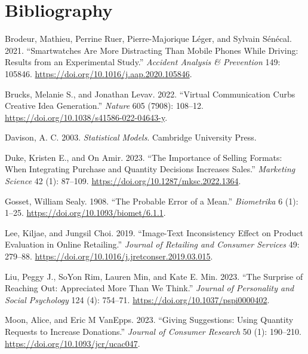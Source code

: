 \documentclass[
  11pt,
  letterpaper,
]{scrbook}
\newlength{\cslhangindent}
\newenvironment{CSLReferences}[2] %
 {\begin{list}{}{%
  \setlength{\itemindent}{0pt}
  \setlength{\leftmargin}{0pt}
  \setlength{\parsep}{0pt}
  \ifodd #1
   \setlength{\leftmargin}{\cslhangindent}
   \setlength{\itemindent}{-1\cslhangindent}
  \fi
  \setlength{\itemsep}{#2\baselineskip}}}
 {\end{list}}
\theoremstyle{plain}
\theoremstyle{definition}
\theoremstyle{definition}
\theoremstyle{remark}
\begin{document}

\chapter*{Bibliography}\label{bibliography}


\label{refs}
\begin{CSLReferences}{1}{0}
Brodeur, Mathieu, Perrine Ruer, Pierre-Majorique Léger, and Sylvain
Sénécal. 2021. {``Smartwatches Are More Distracting Than Mobile Phones
While Driving: Results from an Experimental Study.''} \emph{Accident
Analysis \& Prevention} 149: 105846.
\url{https://doi.org/10.1016/j.aap.2020.105846}.

Brucks, Melanie S., and Jonathan Levav. 2022. {``Virtual Communication
Curbs Creative Idea Generation.''} \emph{Nature} 605 (7908): 108--12.
\url{https://doi.org/10.1038/s41586-022-04643-y}.

Davison, A. C. 2003. \emph{Statistical Models}. Cambridge University
Press.

Duke, Kristen E., and On Amir. 2023. {``The Importance of Selling
Formats: When Integrating Purchase and Quantity Decisions Increases
Sales.''} \emph{Marketing Science} 42 (1): 87--109.
\url{https://doi.org/10.1287/mksc.2022.1364}.

Gosset, William Sealy. 1908. {``The Probable Error of a Mean.''}
\emph{Biometrika} 6 (1): 1--25.
\url{https://doi.org/10.1093/biomet/6.1.1}.

Lee, Kiljae, and Jungsil Choi. 2019. {``Image-Text Inconsistency Effect
on Product Evaluation in Online Retailing.''} \emph{Journal of Retailing
and Consumer Services} 49: 279--88.
\url{https://doi.org/10.1016/j.jretconser.2019.03.015}.

Liu, Peggy J., SoYon Rim, Lauren Min, and Kate E. Min. 2023. {``The
Surprise of Reaching Out: Appreciated More Than We Think.''}
\emph{Journal of Personality and Social Psychology} 124 (4): 754--71.
\url{https://doi.org/10.1037/pspi0000402}.

Moon, Alice, and Eric M VanEpps. 2023. {``Giving Suggestions: Using
Quantity Requests to Increase Donations.''} \emph{Journal of Consumer
Research} 50 (1): 190--210. \url{https://doi.org/10.1093/jcr/ucac047}.


\end{CSLReferences}
\end{document}
